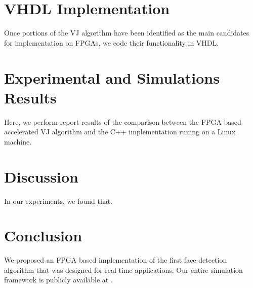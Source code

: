 \documentclass[conference]{IEEEtran}
\begin{document}
\section {VHDL Implementation}


Once portions of the VJ algorithm have been identified as the main candidates for implementation on FPGAs, we code their functionality in VHDL.




\section {Experimental and Simulations Results}
\label{results_section}


Here, we perform report results of the comparison between the FPGA based accelerated VJ algorithm and the C++ implementation runing on a Linux machine.




\section {Discussion}
\label{discussion_section}


In our experiments, we found that. 




\section {Conclusion}


We proposed an FPGA based implementation of the first face detection algorithm that was designed for real time applications. 
Our entire simulation framework is publicly available at \cite{dejazzer-software}.
\end{document}
